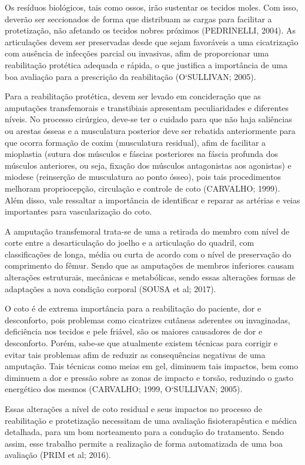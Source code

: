     Os resíduos biológicos, tais como ossos, irão sustentar os tecidos moles. Com isso, deverão ser seccionados de forma que distribuam as cargas para facilitar a protetização, não afetando os tecidos nobres próximos (PEDRINELLI, 2004). As articulações devem ser preservadas desde que sejam favoráveis a uma cicatrização com ausência de infecções parcial ou invasivas, afim de proporcionar uma reabilitação protética adequada e rápida, o que justifica a importância de uma boa avaliação para a prescrição da reabilitação (O‘SULLIVAN; 2005).

    Para a reabilitação protética, devem ser levado em concideração que as amputações transfemorais e transtibiais apresentam peculiaridades e diferentes níveis. No processo cirúrgico, deve-se ter o cuidado para que não haja saliências ou arestas ósseas e a musculatura posterior deve ser rebatida anteriormente para que ocorra formação de coxim (musculatura residual), afim de facilitar a mioplastia (sutura dos músculos e fáscias posteriores na fáscia profunda dos músculos anteriores, ou seja, fixação dos músculos antagonistas aos agonistas) e miodese (reinserção de musculatura ao ponto ósseo), pois tais procedimentos melhoram propriocepção, circulação e controle de coto (CARVALHO; 1999). Além disso, vale ressaltar a importância de identificar e reparar as artérias e veias importantes para vascularização do coto.

    A amputação transfemoral trata-se de uma a retirada do membro com nível de corte entre a desarticulação do joelho e a articulação do quadril, com classificações de longa, média ou curta de acordo com o nível de preservação do comprimento do fêmur. Sendo que as amputações de membros inferiores causam alterações estruturais, mecânicas e metabólicas, sendo essas alterações formas de adaptações a nova condição corporal (SOUSA et al; 2017).

    O coto é de extrema importância para a reabilitação do paciente, dor e desconforto, pois problemas como cicatrizes cutâneas aderentes ou invaginadas, deficiência nos tecidos e pele friável, são os maiores causadores de dor e desconforto. Porém, sabe-se que atualmente existem técnicas para corrigir e evitar tais problemas afim de reduzir as consequências negativas de uma amputação. Tais técnicas como meias em gel, diminuem tais impactos, bem como diminuem a dor e pressão sobre as zonas de impacto e torsão, reduzindo o gasto energético dos mesmos (CARVALHO; 1999, O‘SULLIVAN; 2005).

    Essas alterações a nível de coto residual e seus impactos no processo de reabilitação e protetização necessitam de uma avaliação fisioterapêutica e médica detalhada, para um bom norteamento para a condução do tratamento. Sendo assim, esse trabalho permite a realização de forma automatizada de uma boa avaliação (PRIM et al; 2016).

